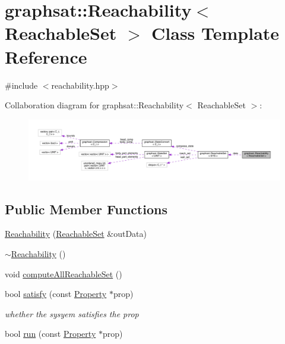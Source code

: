 \hypertarget{classgraphsat_1_1_reachability}{}\section{graphsat\+::Reachability$<$ Reachable\+Set $>$ Class Template Reference}
\label{classgraphsat_1_1_reachability}


{\ttfamily \#include $<$reachability.\+hpp$>$}



Collaboration diagram for graphsat\+::Reachability$<$ Reachable\+Set $>$\+:
\nopagebreak
\begin{figure}[H]
\begin{center}
\leavevmode
\includegraphics[width=350pt]{classgraphsat_1_1_reachability__coll__graph}
\end{center}
\end{figure}
\subsection*{Public Member Functions}
\begin{DoxyCompactItemize}
\item 
\mbox{\hyperlink{classgraphsat_1_1_reachability_a28ada0e8dde0a9d2cb18248a1341b12f}{Reachability}} (\mbox{\hyperlink{classgraphsat_1_1_reachable_set}{Reachable\+Set}} \&out\+Data)
\item 
\mbox{\hyperlink{classgraphsat_1_1_reachability_acb7e4747d6656ba6e932525a073a8c99}{$\sim$\+Reachability}} ()
\item 
void \mbox{\hyperlink{classgraphsat_1_1_reachability_a1fc3182356898a032d6dfac91e302b71}{compute\+All\+Reachable\+Set}} ()
\item 
bool \mbox{\hyperlink{classgraphsat_1_1_reachability_abeea89b7c1d9d21616ff3efb31c5c4f2}{satisfy}} (const \mbox{\hyperlink{classgraphsat_1_1_property}{Property}} $\ast$prop)
\begin{DoxyCompactList}\small\item\em whether the sysyem satisfies the prop \end{DoxyCompactList}\item 
bool \mbox{\hyperlink{classgraphsat_1_1_reachability_a183579baabbe4b26c93a0887d8460d3c}{run}} (const \mbox{\hyperlink{classgraphsat_1_1_property}{Property}} $\ast$prop)
\end{DoxyCompactItemize}
